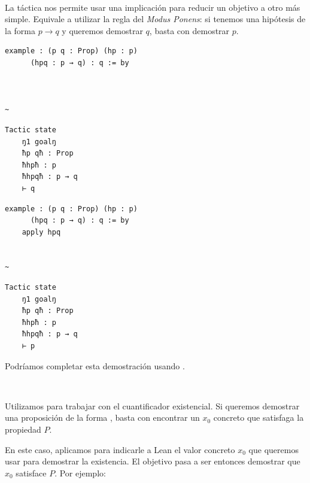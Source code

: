 \vspace{1em}
\noindent\textbf{$~$ }

La táctica  nos permite usar una implicación para reducir un objetivo a otro más simple. Equivale a utilizar la regla del \textit{Modus Ponens}: si tenemos una hipótesis de la forma $p \rightarrow q$ y queremos demostrar $q$, basta con demostrar $p$.

\begin{minipage}[t]{0.58\textwidth}
\begin{lstlisting}[language=lean]
  example : (p q : Prop) (hp : p)
      (hpq : p → q) : q := by



~
\end{lstlisting}
\end{minipage}%
\hfill
\begin{minipage}[t]{0.40\textwidth}
\begin{lstlisting}[language=infoview]
  Tactic state
    ŋ1 goalŋ
    ħp qħ : Prop
    ħhpħ : p
    ħhpqħ : p → q
    ⊢ q
\end{lstlisting}
\end{minipage}
%
\noindent
\makebox[\textwidth]{$\downarrow$}
%
\begin{minipage}[t]{0.58\textwidth}
\begin{lstlisting}[language=lean]
  example : (p q : Prop) (hp : p)
      (hpq : p → q) : q := by
    apply hpq 


~
\end{lstlisting}
\end{minipage}%
\hfill
\begin{minipage}[t]{0.40\textwidth}
\begin{lstlisting}[language=infoview]
  Tactic state
    ŋ1 goalŋ
    ħp qħ : Prop
    ħhpħ : p
    ħhpqħ : p → q
    ⊢ p
\end{lstlisting}
\end{minipage}

Podríamos completar esta demostración usando .


\vspace{1em}
\noindent\textbf{$~$ }

Utilizamos  para trabajar con el cuantificador existencial. Si queremos demostrar una proposición de la forma , basta con encontrar un $x_0$ concreto que satisfaga la propiedad $P$.

En este caso, aplicamos  para indicarle a Lean el valor concreto $x_0$ que queremos usar para demostrar la existencia. El objetivo pasa a ser entonces demostrar que $x_0$ satisface $P$. Por ejemplo:

